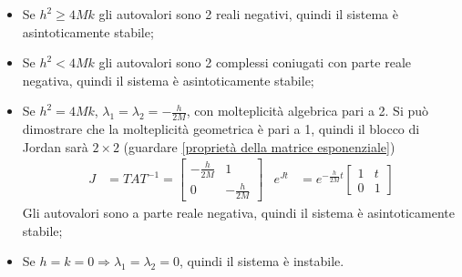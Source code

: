 \documentclass{article}
\numberwithin{equation}{subsection}
\begin{document}
\begin{itemize}
    \item Se $h^2 \geq 4Mk$ gli autovalori sono 2 reali negativi, quindi il sistema è asintoticamente stabile;
    \item Se $h^2 < 4Mk$ gli autovalori sono 2 complessi coniugati con parte reale negativa, quindi il sistema è asintoticamente stabile;
    \item Se $h^2 = 4Mk$, $\lambda_1 = \lambda_2 = -\frac{h}{2M}$, con molteplicità algebrica pari a 2. Si può dimostrare che la molteplicità geometrica è pari a 1, quindi il blocco di Jordan sarà $2 \times 2$ (guardare \ref{proprietà della matrice esponenziale})
    \begin{align*}
        J &= TAT^{-1} = 
        \begin{bmatrix}
            - \frac{h}{2M} & 1\\
            0 & - \frac{h}{2M}
        \end{bmatrix}
        &
        e^{Jt} &= e^{- \frac{h}{2M}t}
        \begin{bmatrix}
            1 & t\\
            0 & 1
        \end{bmatrix}
    \end{align*}
    Gli autovalori sono a parte reale negativa, quindi il sistema è asintoticamente stabile;
    \item Se $h=k=0 \Longrightarrow \lambda_1=\lambda_2=0$, quindi il sistema è instabile.
\end{itemize}
\end{document}

